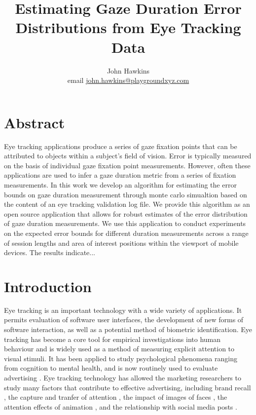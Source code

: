 \documentclass[12pt,a4paper]{article}
\numberwithin{equation}{section}
\begin{document}
 
\title{Estimating Gaze Duration Error Distributions from Eye Tracking Data}

\author{
John Hawkins \\ email \href{mailto:john.hawkins@playgroundxyz.com}{john.hawkins@playgroundxyz.com} \\
} 

\maketitle

\section{Abstract}

Eye tracking applications produce a series of gaze fixation points that can be attributed to
objects within a subject's field of vision. Error is typically measured on the basis of individual
gaze fixation point measurements. However, often these applications are used to infer a gaze duration
metric from a series of fixation measurements. In this work we develop an algorithm for estimating
the error bounds on gaze duration measurement through monte carlo simualtion based on the content
of an eye tracking validation log file. We provide this algorithm as an open source application
that allows for robust estimates of the error distribution of gaze duration measurements. 
We use this application to conduct experiments on the expected error bounds for different duration
measurements across a range of session lengths and area of interest positions within the viewport
of mobile devices. The results indicate...

\section{Introduction}

Eye tracking is an important technology with a wide variety of applications. It permits evaluation
of software user interfaces\cite{Harezlak2015}, the development of new forms of software interaction, as well as a potential method of biometric identification\cite{Kasprowski2018}. 
Eye tracking has become a core tool for empirical investigations 
into human behaviour and is widely used as a method of measuring explicit attention to visual stimuli. 
It has been applied to study psychological phenomena ranging from cognition\cite{Brunye2019}
to mental health\cite{Duque2014,Rudich-Strassler2022}, and is now routinely used to evaluate 
advertising \cite{Hervet2011}. Eye tracking technology has allowed the marketing researchers 
to study many factors that contribute to effective advertising, 
including brand recall \cite{Wedel2000},
the capture and tranfer of attention \cite{Pieters2004}, 
the impact of images of faces \cite{Djamasbi2010},
the attention effects of animation \cite{Hamborg2012},
and the relationship with social media posts \cite{Barreto2013}.
\end{document}
